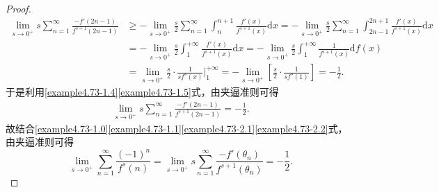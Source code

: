 \documentclass[../../main.tex]{subfiles}%
\begin{document}
\begin{proof}
\begin{align}
\underset{s\rightarrow 0^+}{\lim}s\sum_{n=1}^{\infty}{\frac{-f'\left( 2n-1 \right)}{f^{s+1}\left( 2n-1 \right)}}&\geqslant -\underset{s\rightarrow 0^+}{\lim}\frac{s}{2}\sum_{n=1}^{\infty}{\int_n^{n+1}{\frac{f'\left( x \right)}{f^{s+1}\left( x \right)}\mathrm{d}x}}=-\underset{s\rightarrow 0^+}{\lim}\frac{s}{2}\sum_{n=1}^{\infty}{\int_{2n-1}^{2n+1}{\frac{f'\left( x \right)}{f^{s+1}\left( x \right)}\mathrm{d}x}}
\nonumber
\\
&=-\underset{s\rightarrow 0^+}{\lim}\frac{s}{2}\int_1^{+\infty}{\frac{f'\left( x \right)}{f^{s+1}\left( x \right)}\mathrm{d}x}=-\underset{s\rightarrow 0^+}{\lim}\frac{s}{2}\int_1^{+\infty}{\frac{1}{f^{s+1}\left( x \right)}\mathrm{d}f\left( x \right)}
\nonumber
\\
&=\underset{s\rightarrow 0^+}{\lim}\frac{s}{2}\cdot \frac{1}{sf^s\left( x \right)}\Big|_{1}^{+\infty}=-\underset{s\rightarrow 0^+}{\lim}\left[ \frac{s}{2}\cdot \frac{1}{sf^s\left( 1 \right)} \right] =-\frac{1}{2}.\label{example4.73-1.5}
\end{align}
于是利用\eqref{example4.73-1.4}\eqref{example4.73-1.5}式，由夹逼准则可得
\begin{align}
\lim_{s\rightarrow 0^+}s\sum_{n = 1}^{\infty}\frac{-f'(2n - 1)}{f^{s + 1}(2n - 1)} = -\frac{1}{2}. \label{example4.73-2.2} 
\end{align}
故结合\eqref{example4.73-1.0}\eqref{example4.73-1.1}\eqref{example4.73-2.1}\eqref{example4.73-2.2}式，由夹逼准则可得
\[
\lim_{s\rightarrow 0^+} \sum_{n = 1}^{\infty}\frac{(-1)^n}{f^s(n)} = \lim_{s\rightarrow 0^+} s\sum_{n = 1}^{\infty}\frac{-f'(\theta_n)}{f^{s + 1}(\theta_n)} = -\frac{1}{2}.
\]
\end{proof}
\end{document}
